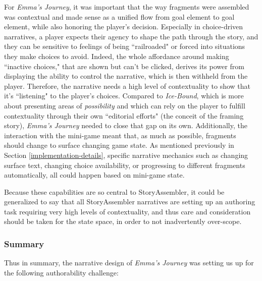 For \textit{Emma's Journey}, it was important that the way fragments were assembled was contextual and made sense as a unified flow from goal element to goal element, while also honoring the player's decision. Especially in choice-driven narratives, a player expects their agency to shape the path through the story, and they can be sensitive to feelings of being ``railroaded" or forced into situations they make choices to avoid. Indeed, the whole affordance around making ``inactive choices," that are shown but can't be clicked, derives its power from displaying the ability to control the narrative, which is then withheld from the player. Therefore, the narrative needs a high level of contextuality to show that it's ``listening" to the player's choices. Compared to \textit{Ice-Bound}, which is more about presenting areas of \textit{possibility} and which can rely on the player to fulfill contextuality through their own ``editorial efforts" (the conceit of the framing story), \textit{Emma's Journey} needed to close that gap on its own. Additionally, the interaction with the mini-game meant that, as much as possible, fragments should change to surface changing game state. As mentioned previously in Section \ref{implementation-details}, specific narrative mechanics such as changing surface text, changing choice availability, or progressing to different fragments automatically, all could happen based on mini-game state.

Because these capabilities are so central to StoryAssembler, it could be generalized to say that all StoryAssembler narratives are setting up an authoring task requiring very high levels of contextuality, and thus care and consideration should be taken for the state space, in order to not inadvertently over-scope.

\subsubsection{Summary}

Thus in summary, the narrative design of \textit{Emma's Journey} was setting us up for the following authorability challenge:

